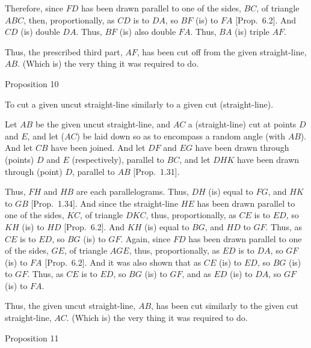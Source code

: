 Therefore, since $FD$ has been drawn parallel to one of the sides, $BC$,
of triangle $ABC$, then, proportionally, as $CD$ is to $DA$, so $BF$ (is) to
$FA$ [Prop.~6.2].
And $CD$ (is) double $DA$.  Thus, $BF$ (is) also double $FA$. Thus, $BA$ (is)
triple $AF$.

Thus, the prescribed third part, $AF$, has been cut off from the given
straight-line, $AB$. (Which is) the very thing it was required to do.


\begin{center}
{\large Proposition 10}
\end{center}

To cut a given uncut  straight-line similarly
to a given cut (straight-line).

\epsfysize=2.2in
\centerline{}

Let $AB$ be the given uncut straight-line, and $AC$ a  (straight-line) cut at
points $D$ and $E$, and let ($AC$) be laid down so as to encompass a random angle (with $AB$).  And let $CB$ have been joined. And let $DF$ and $EG$ have been
drawn through (points) $D$ and $E$ (respectively), parallel to $BC$, and let $DHK$
have been drawn through (point) $D$, parallel to $AB$  [Prop.~1.31].

Thus, $FH$ and $HB$ are each parallelograms. Thus, $DH$ (is) equal to $FG$,
and $HK$ to $GB$ [Prop.~1.34]. 
And since the straight-line $HE$ has been drawn parallel to one of the
sides, $KC$, of triangle $DKC$, thus, proportionally, as $CE$ is to $ED$,  so $KH$
(is) to $HD$ [Prop.~6.2]. And $KH$ (is)
equal to $BG$, and $HD$ to $GF$. Thus, as $CE$ is to $ED$, so $BG$ (is) to $GF$. 
Again, since $FD$ has been drawn parallel to one of the sides, $GE$, of
triangle $AGE$, thus, proportionally, as $ED$ is to $DA$, so $GF$ (is) to $FA$
[Prop.~6.2]. And it was also shown
that as $CE$ (is) to $ED$, so $BG$ (is) to $GF$. Thus, as
$CE$ is to $ED$, so $BG$ (is) to $GF$, and as $ED$ (is) to $DA$, so $GF$ (is) to
$FA$.

Thus, the given uncut straight-line, $AB$, has been cut similarly
to the given cut straight-line, $AC$. (Which is) the very thing it was required to do.


\begin{center}
{\large Proposition 11}
\end{center}

